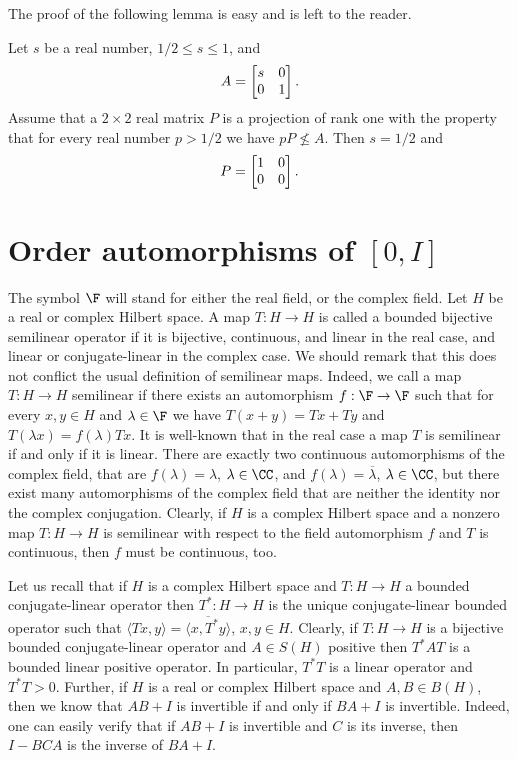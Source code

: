 \documentclass{article}
\begin{document}
The proof of the following lemma is easy and is left to the reader.

\begin{lemma}\label{dontr}
Let $s$ be a real number, $1/2 \le s \le 1$, and
$$
A =  \left[ \begin{matrix} s& 0 \cr 0 & 1 \cr \end{matrix} \right] .
$$
Assume that a $2\times 2$ real matrix $P$ is a projection of rank one with the property that for every real number $p > 1/2$ we have $pP \not\le A$. Then $s=1/2$ and
$$
P =  \left[ \begin{matrix} 1& 0 \cr 0 & 0 \cr \end{matrix} \right] .
$$
\end{lemma}

\section{Order automorphisms of $[0,I]$}

The symbol $\F$ will stand for either the real field, or the complex field. Let $H$ be a real or complex Hilbert space. A map $T:H \to H$ is called a bounded bijective semilinear operator if it is bijective, continuous, and linear in the real case, and linear or conjugate-linear in the complex case. We should remark that this does not conflict the usual definition of semilinear maps. Indeed, we call a map $T : H \to H$ semilinear if there exists an automorphism $f: \F \to \F$ such that for every $x,y \in H$ and $\lambda \in \F$ we have $T(x+y) = Tx + Ty$ and $T(\lambda x ) = f(\lambda) Tx$. It is well-known that in the real case a map $T$ is semilinear if and only if it is linear. There are exactly two continuous automorphisms of the complex field, that are $f(\lambda) = \lambda$, $\lambda \in \CC$, and $f(\lambda) = \overline{\lambda}$, $\lambda \in \CC$, but there exist many automorphisms of the complex field that are neither the identity nor the complex conjugation. Clearly, if $H$ is a complex Hilbert space and a nonzero map $T : H \to H$ is semilinear with respect to the field automorphism $f$ and $T$ is continuous, then $f$ must be continuous, too.

Let us recall that if $H$ is a complex Hilbert space and $T : H \to H$ a bounded conjugate-linear operator then $T^\ast : H \to H$ is the unique conjugate-linear bounded operator such that $\langle Tx,y \rangle = \overline{ \langle x, T^\ast y \rangle }$, $x,y \in H$. Clearly, if $T : H \to H$ is a bijective bounded conjugate-linear operator and $A \in S(H)$ positive then $T^\ast AT$ is a bounded linear positive  operator. In particular,
$T^\ast T$ is a linear operator and $T^\ast T > 0$. Further, if $H$ is a real or complex Hilbert space and $A,B \in B(H)$, then we know that $AB+I$ is invertible if and only if $BA + I$ is invertible. Indeed, one can easily verify that if $AB+I$ is invertible and $C$ is its inverse, then $I - BCA$ is the inverse of $BA + I$.
\end{document}
